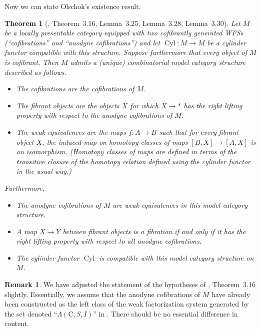 \documentclass{article}
\theoremstyle{definition}
\newtheorem{remark}[definition]{Remark}
\theoremstyle{plain}
\newtheorem{theorem}[definition]{Theorem}
\DeclareMathOperator{\Cyl}{Cyl}
\begin{document}
Now we can state Olschok's existence result.

\begin{theorem}[\cite{O}, Theorem~3.16, Lemma~3.25, Lemma~3.28, Lemma~3.30]
  Let $M$ be a locally presentable category equipped with two cofibrantly generated WFSs (``cofibrations'' and ``anodyne cofibrations'') and let $\Cyl : M \to M$ be a cylinder functor compatible with this structure.
  Suppose furthermore that every object of $M$ is cofibrant.
  Then $M$ admits a (unique) combinatorial model category structure described as follows.
  \begin{itemize}
  \item The cofibrations are the cofibrations of $M$.
  \item The fibrant \emph{objects} are the objects $X$ for which $X \to *$ has the right lifting property with respect to the anodyne cofibrations of $M$.
  \item The weak equivalences are the maps $f : A \to B$ such that for every fibrant object $X$, the induced map on homotopy classes of maps $[B, X] \to [A, X]$ is an isomorphism.
    (Homotopy classes of maps are defined in terms of the transitive closure of the homotopy relation defined using the cylinder functor in the usual way.)
  \end{itemize}
  Furthermore,
  \begin{itemize}
  \item The anodyne cofibrations of $M$ are weak equivalences in this model category structure.
  \item A map $X \to Y$ between fibrant objects is a fibration if and only if it has the right lifting property with respect to all anodyne cofibrations.
  \item The cylinder functor $\Cyl$ is compatible with this model category structure on $M$.
  \end{itemize}
\end{theorem}

\begin{remark}
  We have adjusted the statement of the hypotheses of \cite{O}, Theorem~3.16 slightly.
  Essentially, we assume that the anodyne cofibrations of $M$ have already been constructed as the left class of the weak factorization system generated by the set denoted ``$\Lambda(\mathrm{C}, S, I)$'' in \cite{O}.
  There should be no essential difference in content.
\end{remark}
\end{document}
